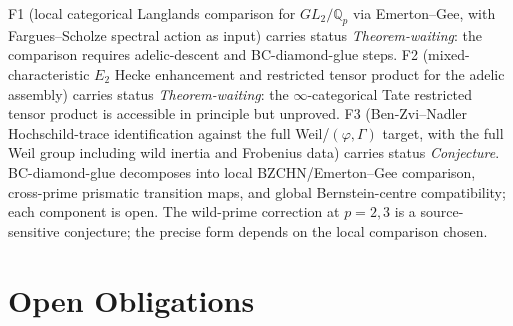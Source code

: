 \begin{remark}
\label{v4-arith:fle-audit:rem:corrected-status}
F1 (local categorical Langlands comparison for \(GL_{2}/\mathbb{Q}_{p}\)
via Emerton--Gee, with Fargues--Scholze spectral action as input)
carries status \emph{Theorem-waiting}: the comparison requires
adelic-descent and BC-diamond-glue steps.
F2 (mixed-characteristic \(E_{2}\) Hecke enhancement and restricted
tensor product for the adelic assembly) carries status
\emph{Theorem-waiting}: the \(\infty\)-categorical Tate restricted
tensor product is accessible in principle but unproved.
F3 (Ben-Zvi--Nadler Hochschild-trace identification against the full
Weil/\((\varphi,\Gamma)\) target, with the full Weil group including
wild inertia and Frobenius data) carries status \emph{Conjecture}.
BC-diamond-glue decomposes into local BZCHN/Emerton--Gee
comparison, cross-prime prismatic transition maps, and global
Bernstein-centre compatibility; each component is open.
The wild-prime correction at \(p = 2, 3\) is a source-sensitive
conjecture; the precise form depends on the local comparison chosen.
\end{remark}

\section{Open Obligations}
\label{v4-arith:fle-audit:open-obligations}

